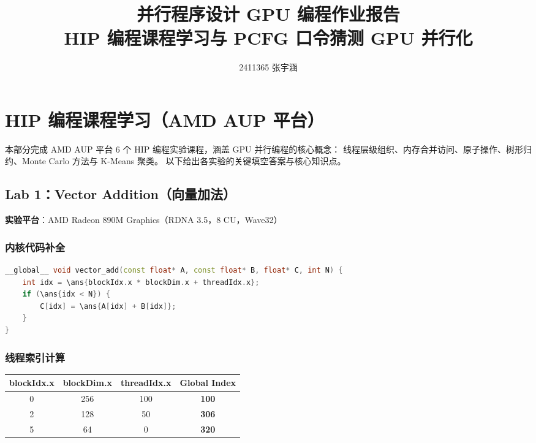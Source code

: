 \documentclass[12pt,a4paper]{article}
\title{{\bf 并行程序设计 GPU 编程作业报告}\\ HIP 编程课程学习与 PCFG 口令猜测 GPU 并行化}
\author{2411365 张宇涵}
\date{}
\newcommand{\ans}[1]{\textcolor{answerblue}{\textbf{#1}}}
\begin{document}
\maketitle

\section{HIP 编程课程学习（AMD AUP 平台）}

本部分完成 AMD AUP 平台 6 个 HIP 编程实验课程，涵盖 GPU 并行编程的核心概念：
线程层级组织、内存合并访问、原子操作、树形归约、Monte Carlo 方法与 K-Means 聚类。
以下给出各实验的关键填空答案与核心知识点。

\subsection{Lab 1：Vector Addition（向量加法）}

\textbf{实验平台}：AMD Radeon 890M Graphics（RDNA 3.5，8 CU，Wave32）

\subsubsection*{内核代码补全}
\begin{lstlisting}[language=C++]
__global__ void vector_add(const float* A, const float* B, float* C, int N) {
    int idx = \ans{blockIdx.x * blockDim.x + threadIdx.x};
    if (\ans{idx < N}) {
        C[idx] = \ans{A[idx] + B[idx]};
    }
}
\end{lstlisting}

\subsubsection*{线程索引计算}
\begin{table}[H]
\centering
\begin{tabular}{cccc}
\toprule
blockIdx.x & blockDim.x & threadIdx.x & Global Index \\
\midrule
0 & 256 & 100 & \ans{100} \\
2 & 128 & 50  & \ans{306} \\
5 & 64  & 0   & \ans{320} \\
\bottomrule
\end{tabular}
\end{table}
\end{document}
